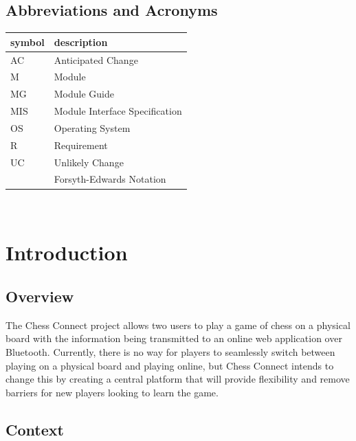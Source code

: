 \documentclass[12pt, titlepage]{article}
\begin{document}
\subsection{Abbreviations and Acronyms}

\renewcommand{\arraystretch}{1.2}
\begin{tabular}{l l} 
  \toprule		
  \textbf{symbol} & \textbf{description}\\
  \midrule 
  AC & Anticipated Change\\
  M & Module \\
  MG & Module Guide \\
  MIS & Module Interface Specification \\
  OS & Operating System \\
  R & Requirement\\
  UC & Unlikely Change \\
  \cite{FEN} & Forsyth-Edwards Notation\\
  \bottomrule
\end{tabular}\\

\newpage

\tableofcontents

\listoftables

\listoffigures

\newpage


\section{Introduction}

\subsection{Overview}

The Chess Connect project allows two users to play a game of chess on a physical board with the information being transmitted to an online web application over Bluetooth.
Currently, there is no way for players to seamlessly switch between playing on a physical board and playing online, but Chess Connect intends to change this by creating a central platform that will provide flexibility and remove barriers for new players looking to learn the game.

\subsection{Context}
\end{document}
